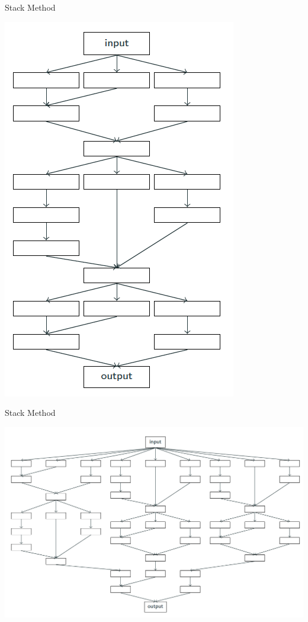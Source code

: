 \documentclass{beamer}
\begin{document}
\begin{frame}{Stack Method}
    \begin{center}
        \includegraphics[scale=0.27]{NAS/chained-nerual-net.png}
    \end{center}
\end{frame}



\begin{frame}{Stack Method}
    \begin{center}
          \includegraphics[width=0.8\linewidth]{NAS/multibranch-neural-net.png}
    \end{center}
\end{frame}
\end{document}
